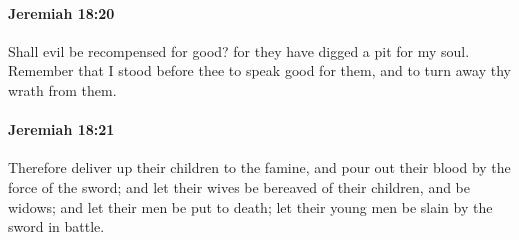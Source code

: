 		\paragraph{Jeremiah 18:20} %
			\label{JEREMIAH-18-20}

			Shall evil be recompensed for good? for they have digged a pit for my soul. Remember that I stood before thee to speak good for them, and to turn away thy wrath from them.


		\paragraph{Jeremiah 18:21} %
			\label{JEREMIAH-18-21}

			Therefore deliver up their children to the famine, and pour out their blood by the force of the sword; and let their wives be bereaved of their children, and be widows; and let their men be put to death; let their young men be slain by the sword in battle.


